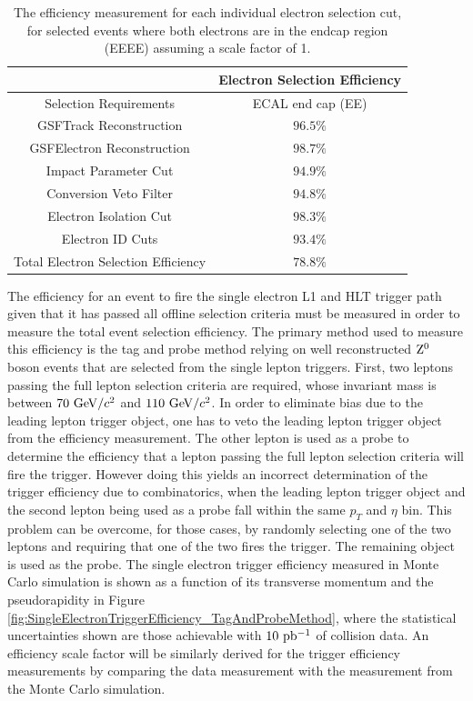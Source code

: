 \documentclass{cmspaper}
\begin{document}
\begin{table}[!ht]
\begin{center}
\begin{tabular}{|c|c|}
\hline
 & Electron Selection Efficiency \\
\hline
 Selection Requirements &  ECAL end cap (EE) \\
\hline
\hline
 GSFTrack Reconstruction             & $96.5\%$  \\
 GSFElectron Reconstruction          & $98.7\%$  \\
 Impact Parameter Cut                & $94.9\%$  \\
 Conversion Veto Filter              & $94.8\%$  \\
 Electron Isolation Cut              & $98.3\%$  \\
 Electron ID Cuts                    & $93.4\%$  \\
\hline                               
 Total Electron Selection Efficiency & $78.8\%$  \\
\hline
\end{tabular}
\caption{The efficiency measurement for each individual electron selection cut, for selected \Z\To\Ep\Em events where both electrons are in the endcap region (EEEE) assuming a scale factor of 1. \label{tab:electronEfficiencies_EEEE}}
\end{center}
\end{table}


The efficiency for an event to fire the single electron L1 and HLT trigger path given that it has passed all offline selection criteria must be measured in order to measure the total event selection efficiency. The primary method used to measure this efficiency is the tag and probe method relying on well reconstructed $\mathrm{Z^0}$ boson events that are selected from the single lepton triggers. First, two leptons passing the full lepton selection criteria are required, whose invariant mass is between $70\ \mathrm{Ge\kern -0.1em V/}c^2$ and $110\ \mathrm{Ge\kern -0.1em V/}c^2$. In order to eliminate bias due to the leading lepton trigger object, one has to veto the leading lepton trigger object from the efficiency measurement. The other lepton is used as a probe to determine the efficiency that a lepton passing the full lepton selection criteria will fire the trigger. However doing this yields an incorrect determination of the trigger efficiency due to combinatorics, when the leading lepton trigger object and the second lepton being used as a probe fall within the same $p_T$ and $\eta$ bin. This problem can be overcome, for those cases, by randomly selecting one of the two leptons and requiring that one of the two fires the trigger. The remaining object is used as the probe. The single electron trigger efficiency measured in Monte Carlo simulation is shown as a function of its transverse momentum and the pseudorapidity in Figure \ref{fig:SingleElectronTriggerEfficiency_TagAndProbeMethod}, where the statistical uncertainties shown are those achievable with $10\ \mathrm{pb^{-1}}$ of collision data. An efficiency scale factor will be similarly derived for the trigger efficiency measurements by comparing the data measurement with the measurement from the Monte Carlo simulation.
\end{document}
